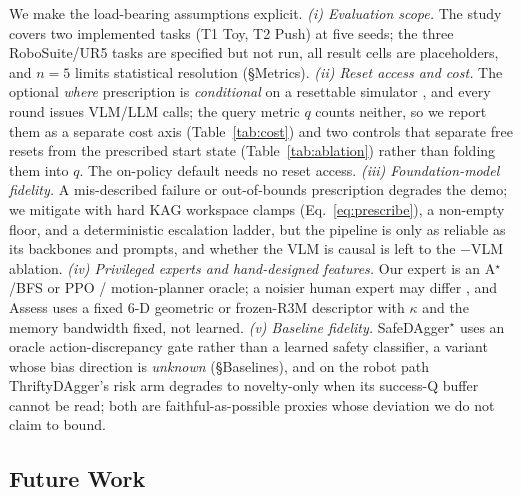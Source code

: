 \documentclass[letterpaper]{article} %
\begin{document}
We make the load-bearing assumptions explicit. \emph{(i) Evaluation scope.} The
study covers two implemented tasks (T1 Toy, T2 Push) at five seeds; the three
RoboSuite/UR5 tasks are specified but not run, all result cells are placeholders,
and $n{=}5$ limits statistical resolution (\S Metrics).
\emph{(ii) Reset access and cost.} The optional \emph{where} prescription is
\emph{conditional} on a resettable simulator
\cite{eysenbach2018leavenotrace,florensa2017reversecurriculum}, and every round
issues VLM/LLM calls; the query metric $q$ counts neither, so we report them as a
separate cost axis (Table~\ref{tab:cost}) and two controls that
separate free resets from the prescribed start state (Table~\ref{tab:ablation})
rather than folding them into $q$. The on-policy default needs no reset access.
\emph{(iii) Foundation-model fidelity.} A mis-described failure or
out-of-bounds prescription degrades the demo; we mitigate with hard KAG workspace
clamps (Eq.~\eqref{eq:prescribe}), a non-empty floor, and a deterministic
escalation ladder, but the pipeline is only as reliable as its backbones and
prompts, and whether the VLM is causal is left to the $-$VLM ablation.
\emph{(iv) Privileged experts and hand-designed features.} Our expert is an
A$^\star$/BFS or PPO / motion-planner oracle; a noisier human expert may differ
\cite{mandlekar2020iwr,liu2023sirius}, and Assess uses a fixed $6$-D geometric or
frozen-R3M \cite{nair2022r3m} descriptor with $\kappa$ and the memory bandwidth
fixed, not learned. \emph{(v) Baseline fidelity.} SafeDAgger$^\star$ uses an oracle
action-discrepancy gate rather than a learned safety classifier, a variant whose
bias direction is \emph{unknown} (\S Baselines),
and on the robot path ThriftyDAgger's risk arm degrades to novelty-only when its
success-Q buffer cannot be read; both are faithful-as-possible proxies whose
deviation we do not claim to bound.

\subsection{Future Work}
\label{sec:future-work}
\end{document}
